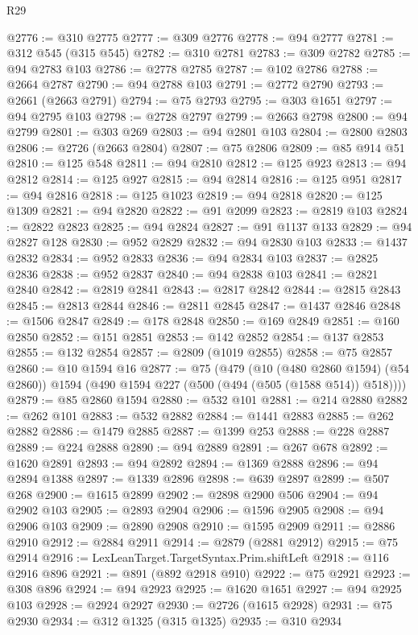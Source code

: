 \begin{lexlean}{R29}
\begin{coremodule}
@2776 := @310 @2775
@2777 := @309 @2776
@2778 := @94 @2777
@2781 := @312 @545 (@315 @545)
@2782 := @310 @2781
@2783 := @309 @2782
@2785 := @94 @2783 @103
@2786 := @2778 @2785
@2787 := @102 @2786
@2788 := @2664 @2787
@2790 := @94 @2788 @103
@2791 := @2772 @2790
@2793 := @2661 (@2663 @2791)
@2794 := @75 @2793
@2795 := @303 @1651
@2797 := @94 @2795 @103
@2798 := @2728 @2797
@2799 := @2663 @2798
@2800 := @94 @2799
@2801 := @303 @269
@2803 := @94 @2801 @103
@2804 := @2800 @2803
@2806 := @2726 (@2663 @2804)
@2807 := @75 @2806
@2809 := @85 @914 @51
@2810 := @125 @548
@2811 := @94 @2810
@2812 := @125 @923
@2813 := @94 @2812
@2814 := @125 @927
@2815 := @94 @2814
@2816 := @125 @951
@2817 := @94 @2816
@2818 := @125 @1023
@2819 := @94 @2818
@2820 := @125 @1309
@2821 := @94 @2820
@2822 := @91 @2099
@2823 := @2819 @103
@2824 := @2822 @2823
@2825 := @94 @2824
@2827 := @91 @1137 @133
@2829 := @94 @2827 @128
@2830 := @952 @2829
@2832 := @94 @2830 @103
@2833 := @1437 @2832
@2834 := @952 @2833
@2836 := @94 @2834 @103
@2837 := @2825 @2836
@2838 := @952 @2837
@2840 := @94 @2838 @103
@2841 := @2821 @2840
@2842 := @2819 @2841
@2843 := @2817 @2842
@2844 := @2815 @2843
@2845 := @2813 @2844
@2846 := @2811 @2845
@2847 := @1437 @2846
@2848 := @1506 @2847
@2849 := @178 @2848
@2850 := @169 @2849
@2851 := @160 @2850
@2852 := @151 @2851
@2853 := @142 @2852
@2854 := @137 @2853
@2855 := @132 @2854
@2857 := @2809 (@1019 @2855)
@2858 := @75 @2857
@2860 := @10 @1594 @16
@2877 := @75
    (@479
      (@10 (@480 @2860 @1594) (@54 @2860))
      @1594
      (@490 @1594 @227 (@500 (@494 (@505 (@1588 @514)) @518))))
@2879 := @85 @2860 @1594
@2880 := @532 @101
@2881 := @214 @2880
@2882 := @262 @101
@2883 := @532 @2882
@2884 := @1441 @2883
@2885 := @262 @2882
@2886 := @1479 @2885
@2887 := @1399 @253
@2888 := @228 @2887
@2889 := @224 @2888
@2890 := @94 @2889
@2891 := @267 @678
@2892 := @1620 @2891
@2893 := @94 @2892
@2894 := @1369 @2888
@2896 := @94 @2894 @1388
@2897 := @1339 @2896
@2898 := @639 @2897
@2899 := @507 @268
@2900 := @1615 @2899
@2902 := @2898 @2900 @506
@2904 := @94 @2902 @103
@2905 := @2893 @2904
@2906 := @1596 @2905
@2908 := @94 @2906 @103
@2909 := @2890 @2908
@2910 := @1595 @2909
@2911 := @2886 @2910
@2912 := @2884 @2911
@2914 := @2879 (@2881 @2912)
@2915 := @75 @2914
@2916 := LexLeanTarget.TargetSyntax.Prim.shiftLeft
@2918 := @116 @2916 @896
@2921 := @891 (@892 @2918 @910)
@2922 := @75 @2921
@2923 := @308 @896
@2924 := @94 @2923
@2925 := @1620 @1651
@2927 := @94 @2925 @103
@2928 := @2924 @2927
@2930 := @2726 (@1615 @2928)
@2931 := @75 @2930
@2934 := @312 @1325 (@315 @1325)
@2935 := @310 @2934

\end{coremodule}
\end{lexlean}

